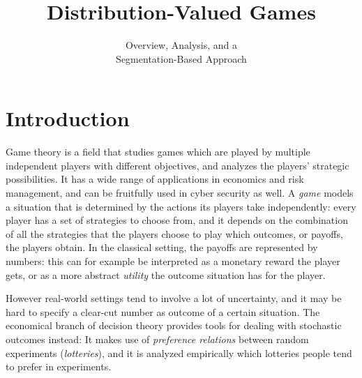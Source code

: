 \documentclass[a4paper]{scrreprt}
\title{\huge Distribution-Valued Games}
\subtitle{\LARGE Overview, Analysis, and a \\Segmentation-Based Approach}
\theoremstyle{definition}
\begin{document}
    \maketitle
    \tableofcontents
    
    \chapter{Introduction}
    Game theory is a field that studies games which are played by multiple independent players with different objectives, and analyzes the players' strategic possibilities.
    It has a wide range of applications in economics and risk management, and can be fruitfully used in cyber security as well.
    A \emph{game} models a situation that is determined by the actions its players take independently: every player has a set of strategies to choose from, and it depends on the combination of all the strategies that the players choose to play which outcomes, or payoffs, the players obtain. In the classical setting, the payoffs are represented by numbers: this can for example be interpreted as a monetary reward the player gets, or as a more abstract \emph{utility} the outcome situation has for the player.
    
    However real-world settings tend to involve a lot of uncertainty, and it may be hard to specify a clear-cut number as outcome of a certain situation. The economical branch of decision theory provides tools for dealing with stochastic outcomes instead: It makes use of \emph{preference relations} between random experiments (\emph{lotteries}), and it is analyzed empirically which lotteries people tend to prefer in experiments.
    
\end{document}
